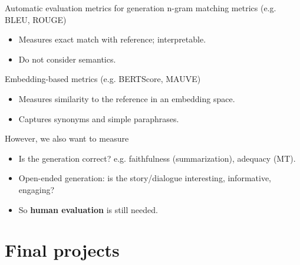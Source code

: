 \documentclass[usenames,dvipsnames,notes,11pt,aspectratio=169,hyperref={colorlinks=true, linkcolor=blue}]{beamer}
\begin{document}
\begin{frame}
    {Automatic evaluation metrics for generation}
    n-gram matching metrics (e.g. BLEU, ROUGE)\\
    \begin{itemize}
        \item Measures exact match with reference; interpretable.
        \item Do not consider semantics.
    \end{itemize}

    Embedding-based metrics (e.g. BERTScore, MAUVE)\\
    \begin{itemize}
        \item Measures similarity to the reference in an embedding space.
        \item Captures synonyms and simple paraphrases.
    \end{itemize}

    However, we also want to measure\\
    \begin{itemize}
        \item Is the generation correct? e.g. faithfulness (summarization), adequacy (MT).
        \item Open-ended generation: is the story/dialogue interesting, informative, engaging?
        \item So \textbf{human evaluation} is still needed.
    \end{itemize}
\end{frame}

%
%

\section{Final projects}
\end{document}
